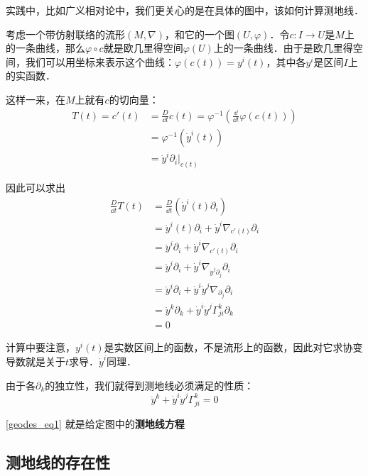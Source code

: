 实践中，比如广义相对论中，我们更关心的是在具体的图中，该如何计算测地线．

考虑一个带仿射联络的流形$(M, \nabla)$，和它的一个图$(U, \varphi)$．令$c:I\to U$是$M$上的一条曲线，那么$\varphi\circ c$就是欧几里得空间$\varphi(U)$上的一条曲线．由于是欧几里得空间，我们可以用坐标来表示这个曲线：$\varphi(c(t))=y^i(t)$，其中各$y^i$是区间$I$上的实函数．


这样一来，在$M$上就有$c$的切向量：
\begin{equation}
\begin{aligned}
T(t)=c'(t)&=\frac{D}{\dd t}c(t)=\varphi^{-1}(\frac{\dd}{\dd t}\varphi(c(t)))\\
&=\varphi^{-1}(\dot{y}^i(t))\\
&=\dot{y}^i\partial_i|_{c(t)}
\end{aligned}
\end{equation}

因此可以求出
\begin{equation}
\begin{aligned}
\frac{D}{\dd t}T(t)&=\frac{D}{\dd t}(\dot{y}^i(t)\partial_i)\\
&=\ddot{y}^i(t)\partial_i+\dot{y}^i\nabla_{c'(t)}\partial_i\\
&=\ddot{y}^i\partial_i+\dot{y}^i\nabla_{c'(t)}\partial_i\\
&=\ddot{y}^i\partial_i+\dot{y}^i\nabla_{\dot{y}^j\partial_j}\partial_i\\
&=\ddot{y}^i\partial_i+\dot{y}^i\dot{y}^j\nabla_{\partial_j}\partial_i\\
&=\ddot{y}^k\partial_k+\dot{y}^i\dot{y}^j\Gamma^k_{ji}\partial_k\\
&=0
\end{aligned}
\end{equation}

计算中要注意，$y^i(t)$是实数区间上的函数，不是流形上的函数，因此对它求协变导数就是关于$t$求导．$\dot{y}^i$同理．

由于各$\partial_k$的独立性，我们就得到测地线必须满足的性质：
\begin{equation}\label{geodes_eq1}
\ddot{y}^k+\dot{y}^i\dot{y}^j\Gamma^k_{ji}=0
\end{equation}

\autoref{geodes_eq1} 就是给定图中的\textbf{测地线方程}


\subsection{测地线的存在性}

